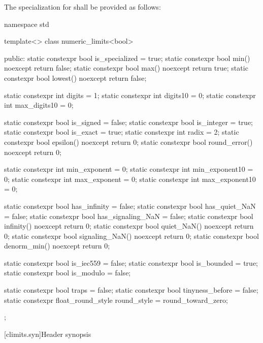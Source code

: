 \pnum
The specialization for
shall be provided as follows:
%
\begin{codeblock}
namespace std {
  template<> class numeric_limits<bool> {
  public:
    static constexpr bool is_specialized = true;
    static constexpr bool min() noexcept { return false; }
    static constexpr bool max() noexcept { return true; }
    static constexpr bool lowest() noexcept { return false; }

    static constexpr int  digits = 1;
    static constexpr int  digits10 = 0;
    static constexpr int  max_digits10 = 0;

    static constexpr bool is_signed = false;
    static constexpr bool is_integer = true;
    static constexpr bool is_exact = true;
    static constexpr int  radix = 2;
    static constexpr bool epsilon() noexcept { return 0; }
    static constexpr bool round_error() noexcept { return 0; }

    static constexpr int  min_exponent = 0;
    static constexpr int  min_exponent10 = 0;
    static constexpr int  max_exponent = 0;
    static constexpr int  max_exponent10 = 0;

    static constexpr bool has_infinity = false;
    static constexpr bool has_quiet_NaN = false;
    static constexpr bool has_signaling_NaN = false;
    static constexpr bool infinity() noexcept { return 0; }
    static constexpr bool quiet_NaN() noexcept { return 0; }
    static constexpr bool signaling_NaN() noexcept { return 0; }
    static constexpr bool denorm_min() noexcept { return 0; }

    static constexpr bool is_iec559 = false;
    static constexpr bool is_bounded = true;
    static constexpr bool is_modulo = false;

    static constexpr bool traps = false;
    static constexpr bool tinyness_before = false;
    static constexpr float_round_style round_style = round_toward_zero;
  };
}
\end{codeblock}

[climits.syn]{Header  synopsis}

